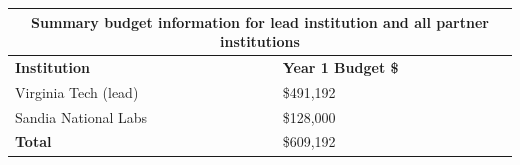 \begin{table}[h]
    \begin{tabular}{|l|l|}
    \hline
    \multicolumn{2}{|c|}{\textbf{Summary budget information for lead institution and all partner institutions}}    \\ \hline
    \textbf{Institution} & \textbf{Year 1 Budget \$} \\ \hline
        Virginia Tech (lead) & \$491,192 \\ \hline
        Sandia National Labs &  \$128,000 \\ \hline
    \textbf{Total} & \$609,192 \\ \hline
    \end{tabular}
    \label{tab:my_label}
\end{table}
